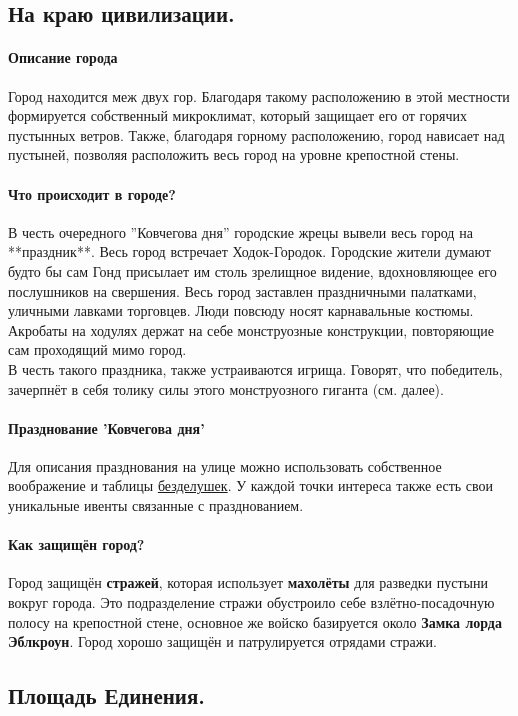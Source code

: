 \documentclass[a4paper,12pt,twoside,twocolumn]{book}
\begin{document}
\subsection{На краю цивилизации.}
\paragraph{Описание города}
Город находится меж двух гор. Благодаря такому расположению в этой местности формируется собственный микроклимат, который защищает его от горячих пустынных ветров. Также, 
благодаря горному расположению, город нависает над пустыней, позволяя расположить весь город на уровне крепостной стены.
\paragraph{Что происходит в городе?}
В честь очередного ''Ковчегова дня'' городские жрецы вывели весь город на **праздник**. Весь город встречает Ходок-Городок. Городские жители думают будто бы сам Гонд присылает 
им столь зрелищное видение, вдохновляющее его послушников на свершения. Весь город заставлен праздничными палатками, уличными лавками торговцев. Люди повсюду носят карнавальные 
костюмы. Акробаты на ходулях держат на себе монструозные конструкции, повторяющие сам проходящий мимо город.
\\ В честь такого праздника, также устраиваются игрища. Говорят, что победитель, зачерпнёт в себя толику силы этого монструозного гиганта (см. далее).
\paragraph{Празднование 'Ковчегова дня'}    %
Для описания празднования на улице можно использовать собственное воображение и таблицы \href{https://dnd.su/articles/inventory/75-trinkets/}{безделушек}. У каждой точки 
интереса также есть свои уникальные ивенты связанные с празднованием.
\paragraph{Как защищён город?}
Город защищён \textbf{стражей}, которая использует \textbf{махолёты} для разведки пустыни вокруг города. Это подразделение стражи обустроило себе взлётно-посадочную полосу 
на крепостной стене, основное же войско базируется около \textbf{Замка лорда Эблкроун}. Город хорошо защищён и патрулируется отрядами стражи.
\subsection{Площадь Единения.}
\end{document}
